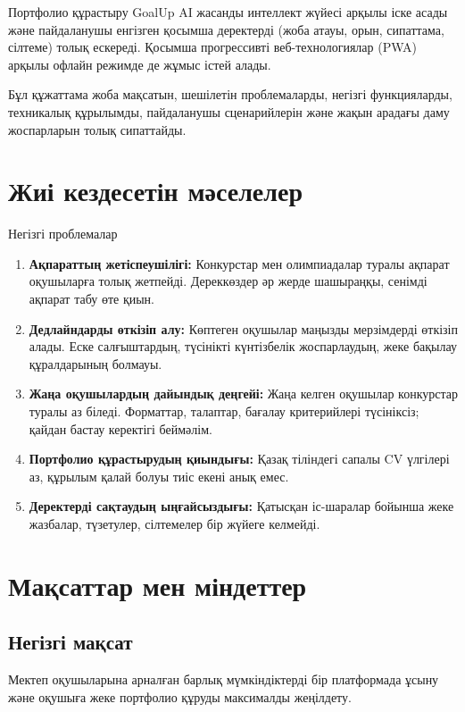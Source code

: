 \documentclass[12pt,a4paper]{article}
\begin{document}
Портфолио құрастыру GoalUp AI жасанды интеллект жүйесі арқылы іске асады және пайдаланушы енгізген қосымша деректерді (жоба атауы, орын, сипаттама, сілтеме) толық ескереді. Қосымша прогрессивті веб-технологиялар (PWA) арқылы офлайн режимде де жұмыс істей алады.

Бұл құжаттама жоба мақсатын, шешілетін проблемаларды, негізгі функцияларды, техникалық құрылымды, пайдаланушы сценарийлерін және жақын арадағы даму жоспарларын толық сипаттайды.

\section{Жиі кездесетін мәселелер}

\begin{featurebox}{Негізгі проблемалар}
\begin{enumerate}[leftmargin=*]
    \item \textbf{Ақпараттың жетіспеушілігі:} Конкурстар мен олимпиадалар туралы ақпарат оқушыларға толық жетпейді. Дереккөздер әр жерде шашыраңқы, сенімді ақпарат табу өте қиын.
    
    \item \textbf{Дедлайндарды өткізіп алу:} Көптеген оқушылар маңызды мерзімдерді өткізіп алады. Еске салғыштардың, түсінікті күнтізбелік жоспарлаудың, жеке бақылау құралдарының болмауы.
    
    \item \textbf{Жаңа оқушылардың дайындық деңгейі:} Жаңа келген оқушылар конкурстар туралы аз біледі. Форматтар, талаптар, бағалау критерийлері түсініксіз; қайдан бастау керектігі беймәлім.
    
    \item \textbf{Портфолио құрастырудың қиындығы:} Қазақ тіліндегі сапалы CV үлгілері аз, құрылым қалай болуы тиіс екені анық емес.
    
    \item \textbf{Деректерді сақтаудың ыңғайсыздығы:} Қатысқан іс-шаралар бойынша жеке жазбалар, түзетулер, сілтемелер бір жүйеге келмейді.
\end{enumerate}
\end{featurebox}

\section{Мақсаттар мен міндеттер}

\subsection{Негізгі мақсат}
Мектеп оқушыларына арналған барлық мүмкіндіктерді бір платформада ұсыну және оқушыға жеке портфолио құруды максималды жеңілдету.
\end{document}
